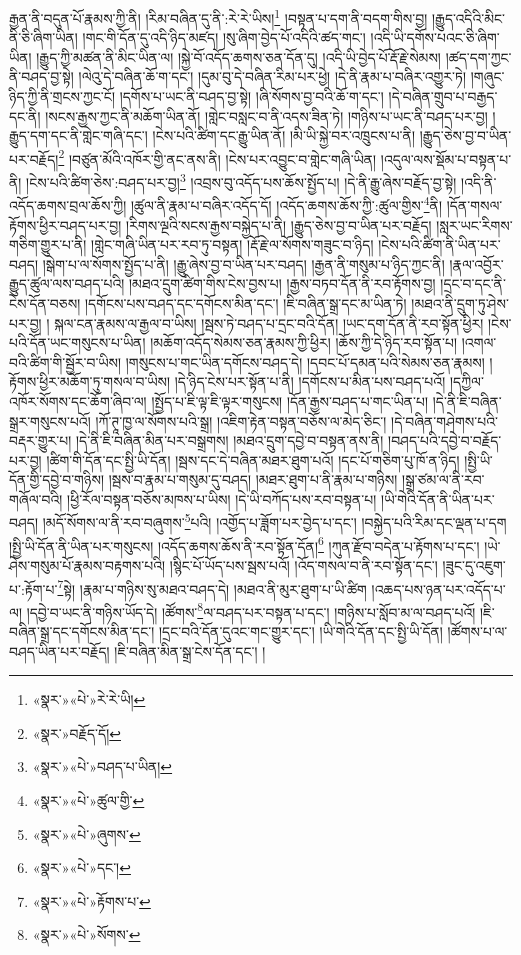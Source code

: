 རྒྱན་ནི་བདུན་པོ་རྣམས་ཀྱི་ནི། །རིམ་བཞིན་དུ་ནི་:རེ་རེ་ཡིས།\footnote{«སྣར་»«པེ་»རེ་རེ་ཡི།} །བསྟན་པ་དག་ནི་བདག་གིས་བྱ། །རྒྱུད་འདིའི་མིང་ནི་ཅི་ཞིག་ཡིན། །གང་གི་དོན་དུ་འདི་ཉིད་མཛད། །སུ་ཞིག་བྱེད་པོ་འདིའི་ཚད་གང་། །འདི་ཡི་དགོས་པའང་ཅི་ཞིག་ཡིན། །རྒྱུད་ཀྱི་མཚན་ནི་མིང་ཡིན་ལ། །སྐྱེ་བོ་འདོད་ཆགས་ཅན་དོན་དུ། །འདི་ཡི་བྱེད་པོ་རྡོ་རྗེ་སེམས། །ཚད་དག་ཀྱང་ནི་བཤད་བྱ་སྟེ། །ལེའུ་དེ་བཞིན་ཆོ་ག་དང་། །དུམ་བུ་དེ་བཞིན་རིམ་པར་ཕྱེ། །དེ་ནི་རྣམ་པ་བཞིར་འགྱུར་ཏེ། །གཞུང་ཉིད་ཀྱི་ནི་གྲངས་ཀྱང་ངོ། །དགོས་པ་ཡང་ནི་བཤད་བྱ་སྟེ། །ཞི་སོགས་བྱ་བའི་ཆོ་ག་དང་། །དེ་བཞིན་གྲུབ་པ་བརྒྱད་དང་ནི། །སངས་རྒྱས་ཀྱང་ནི་མཆོག་ཡིན་ནོ། །གླེང་བསླང་བ་ནི་འདས་ཟིན་ཏེ། །གཉིས་པ་ཡང་ནི་བཤད་པར་བྱ། །རྒྱུད་དག་དང་ནི་གླེང་གཞི་དང་། །ངེས་པའི་ཚིག་དང་རྒྱུ་ཡིན་ནོ། །མི་ཡི་སྐྱེ་བར་འཁྲུངས་པ་ནི། །རྒྱུད་ཅེས་བྱ་བ་ཡིན་པར་བརྗོད།\footnote{«སྣར་»བརྗོད་དོ།} །བཙུན་མོའི་འཁོར་གྱི་ནང་ནས་ནི། །ངེས་པར་འབྱུང་བ་གླེང་གཞི་ཡིན། །འདུལ་ལས་སྡོམ་པ་བསྟན་པ་ནི། །ངེས་པའི་ཚིག་ཅེས་:བཤད་པར་བྱ།\footnote{«སྣར་»«པེ་»བཤད་པ་ཡིན།} །འབྲས་བུ་འདོད་པས་ཆོས་སྤྱོད་པ། །དེ་ནི་རྒྱུ་ཞེས་བརྗོད་བྱ་སྟེ། །འདི་ནི་འདོད་ཆགས་བྲལ་ཆོས་ཀྱི། །ཚུལ་ནི་རྣམ་པ་བཞིར་འདོད་དོ། །འདོད་ཆགས་ཆོས་ཀྱི་:ཚུལ་གྱིས་\footnote{«སྣར་»«པེ་»ཚུལ་གྱི་}ནི། །དོན་གསལ་རྟོགས་ཕྱིར་བཤད་པར་བྱ། །རིགས་ལྔའི་སངས་རྒྱས་བསྐྱེད་པ་ནི། །རྒྱུད་ཅེས་བྱ་བ་ཡིན་པར་བརྗོད། །སླར་ཡང་རིགས་གཅིག་གྱུར་པ་ནི། །གླེང་གཞི་ཡིན་པར་རབ་ཏུ་བསྟན། །རྡོ་རྗེ་ལ་སོགས་གཟུང་བ་ཉིད། །ངེས་པའི་ཚིག་ནི་ཡིན་པར་བཤད། །སྒེག་པ་ལ་སོགས་སྤྱོད་པ་ནི། །རྒྱུ་ཞེས་བྱ་བ་ཡིན་པར་བཤད། །རྒྱན་ནི་གསུམ་པ་ཉིད་ཀྱང་ནི། །རྣལ་འབྱོར་རྒྱུད་ཚུལ་ལས་བཤད་པའི། །མཐའ་དྲུག་ཚིག་གིས་ངེས་བྱས་པ། །རྒྱས་བཏབ་དོན་ནི་རབ་རྟོགས་བྱ། །དྲང་བ་དང་ནི་ངེས་དོན་བཅས། །དགོངས་པས་བཤད་དང་དགོངས་མིན་དང་། །ཇི་བཞིན་སྒྲ་དང་མ་ཡིན་ཏེ། །མཐའ་ནི་དྲུག་ཏུ་ཤེས་པར་བྱ། །
སྐལ་ངན་རྣམས་ལ་རྒྱལ་བ་ཡིས། །སྦས་ཏེ་བཤད་པ་དྲང་བའི་དོན། །ཡང་དག་དོན་ནི་རབ་སྟོན་ཕྱིར། །ངེས་པའི་དོན་ཡང་གསུངས་པ་ཡིན། །མཆོག་འདོད་སེམས་ཅན་རྣམས་ཀྱི་ཕྱིར། །ཆོས་ཀྱི་དེ་ཉིད་རབ་སྟོན་པ། །འགལ་བའི་ཚིག་གི་སྦྱོར་བ་ཡིས། །གསུངས་པ་གང་ཡིན་དགོངས་བཤད་དེ། །དབང་པོ་དམན་པའི་སེམས་ཅན་རྣམས། །རྟོགས་ཕྱིར་མཆོག་ཏུ་གསལ་བ་ཡིས། །དེ་ཉིད་ངེས་པར་སྟོན་པ་ནི། །དགོངས་པ་མིན་པས་བཤད་པའོ། །དཀྱིལ་འཁོར་སོགས་དང་ཆོག་ཞིབ་ལ། །སྤྱོད་པ་ཇི་ལྟ་ཇི་ལྟར་གསུངས། །དོན་རྒྱས་བཤད་པ་གང་ཡིན་པ། །དེ་ནི་ཇི་བཞིན་སྒྲར་གསུངས་པའོ། །ཀོ་ཊཱ་ཁྱ་ལ་སོགས་པའི་སྒྲ། །འཇིག་རྟེན་བསྟན་བཅོས་ལ་མེད་ཅིང་། །དེ་བཞིན་གཤེགས་པའི་བརྡར་གྱུར་པ། །དེ་ནི་ཇི་བཞིན་མིན་པར་བསྒྲགས། །མཐའ་དྲུག་དབྱེ་བ་བསྟན་ནས་ནི། །བཤད་པའི་དབྱེ་བ་བརྗོད་པར་བྱ། །ཚིག་གི་དོན་དང་སྤྱི་ཡི་དོན། །སྦས་དང་དེ་བཞིན་མཐར་ཐུག་པའོ། །དང་པོ་གཅིག་པུ་ཁོ་ན་ཉིད། །སྤྱི་ཡི་དོན་གྱི་དབྱེ་བ་གཉིས། །སྦས་བ་རྣམ་པ་གསུམ་དུ་བཤད། །མཐར་ཐུག་པ་ནི་རྣམ་པ་གཉིས། །སྒྲ་ཙམ་ལ་ནི་རབ་གཞོལ་བའི། །ཕྱི་རོལ་བསྟན་བཅོས་མཁས་པ་ཡིས། །དེ་ཡི་བཀོད་པས་རབ་བསྟན་པ། །ཡི་གེའི་དོན་ནི་ཡིན་པར་བཤད། །མདོ་སོགས་ལ་ནི་རབ་བཞུགས་\footnote{«སྣར་»«པེ་»ཞུགས་}པའི། །འགྱོད་པ་ཟློག་པར་བྱེད་པ་དང་། །བསྐྱེད་པའི་རིམ་དང་ལྡན་པ་དག །སྤྱི་ཡི་དོན་ནི་ཡིན་པར་གསུངས། །འདོད་ཆགས་ཆོས་ནི་རབ་སྟོན་དོན།\footnote{«སྣར་»«པེ་»དང་།} །ཀུན་རྫོབ་བདེན་པ་རྟོགས་པ་དང་། །ཡེ་ཤེས་གསུམ་པོ་རྣམས་བརྟགས་པའི། །སྙིང་པོ་ཡོད་པས་སྦས་པའོ། །འོད་གསལ་བ་ནི་རབ་སྟོན་དང་། །ཟུང་དུ་འཇུག་པ་:རྟོག་པ་\footnote{«སྣར་»«པེ་»རྟོགས་པ་}སྟེ། །རྣམ་པ་གཉིས་སུ་མཐའ་བཤད་དེ། །མཐའ་ནི་མུར་ཐུག་པ་ཡི་ཚིག །འཆད་པས་ཉན་པར་འདོད་པ་ལ། །དབྱེ་བ་ཡང་ནི་གཉིས་ཡོད་དེ། །ཚོགས་\footnote{«སྣར་»«པེ་»སོགས་}ལ་བཤད་པར་བསྟན་པ་དང་། །གཉིས་པ་སློབ་མ་ལ་བཤད་པའོ། །ཇི་བཞིན་སྒྲ་དང་དགོངས་མིན་དང་། །དྲང་བའི་དོན་དུའང་གང་གྱུར་དང་། །ཡི་གེའི་དོན་དང་སྤྱི་ཡི་དོན། །ཚོགས་པ་ལ་བཤད་ཡིན་པར་བརྗོད། །ཇི་བཞིན་མིན་སྒྲ་ངེས་དོན་དང་། །
